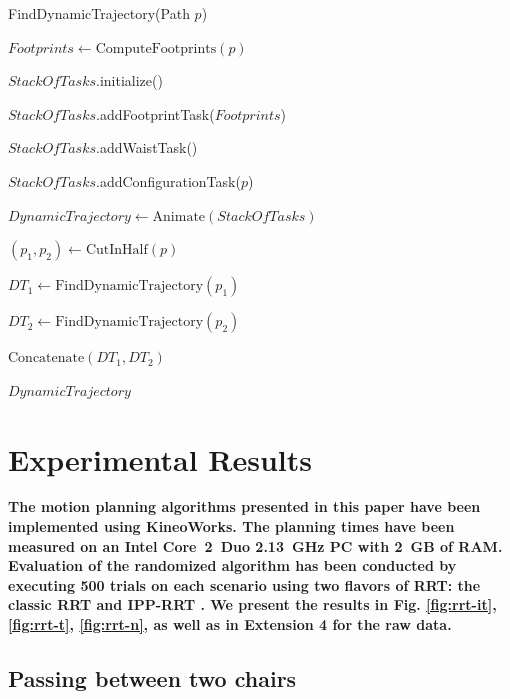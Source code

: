 \documentclass{article}
\begin{document}
\begin{algorithm}[h]
\caption{FindDynamicTrajectory(Path $p$)}
\label{alg:walk}
\begin{algorithmic}
\STATE $Footprints \leftarrow \text{ComputeFootprints}(p)$

\STATE $StackOfTasks$.initialize()

\STATE $StackOfTasks$.addFootprintTask($Footprints$)

\STATE $StackOfTasks$.addWaistTask()

\STATE $StackOfTasks$.addConfigurationTask($p$)

\STATE $DynamicTrajectory \leftarrow \text{Animate}(StackOfTasks)$


\STATE $(p_1,p_2) \leftarrow \text{CutInHalf}(p)$

\STATE $DT_1 \leftarrow \text{FindDynamicTrajectory}(p_1)$

\STATE $DT_2 \leftarrow \text{FindDynamicTrajectory}(p_2)$

\RETURN $\text{Concatenate}(DT_1,DT_2)$

\ELSE

\RETURN $DynamicTrajectory$

\ENDIF
\end{algorithmic}
\end{algorithm}





\section{Experimental Results}

\label{sec:exp}

\textbf{The motion planning algorithms presented in this paper have been
implemented using KineoWorks\texttrademark \cite{laumond2006kcs}. The
planning times have been measured on an Intel Core~2~Duo 2.13~GHz PC
with 2~GB of RAM. Evaluation of the randomized algorithm has been
conducted by executing 500 trials on each scenario using two flavors of
RRT: the classic RRT and IPP-RRT \cite{FERR04A}. We present the
results in Fig. \ref{fig:rrt-it}, \ref{fig:rrt-t}, \ref{fig:rrt-n}, as
well as in Extension 4 for the raw data.}

\subsection{Passing between two chairs}
\end{document}
